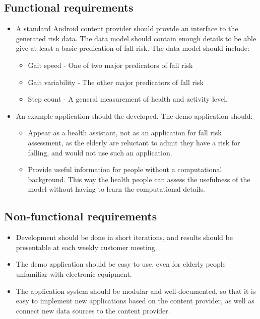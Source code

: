 \subsection{Functional requirements}
\begin{itemize}
\item A standard Android content provider should provide an interface to the generated risk data. The data model should contain enough details to be able give at least a basic predication of fall risk. The data model should include:
\begin{itemize}
\item Gait speed - One of two major predicators of fall risk
\item Gait variability - The other major predicators of fall risk
\item Step count - A general measurement of health and activity level.
\end{itemize}
\item An example application should the developed. The demo application should:
\begin{itemize}
\item Appear as a health assistant, not as an application for fall risk assessment, as the elderly are reluctant to admit they have a risk for falling, and would not use such an application.
\item Provide useful information for people without a computational background. This way the health people can assess the usefulness of the model without having to learn the computational details.
\end{itemize}	
\end{itemize}	

\subsection{Non-functional requirements}
\begin{itemize}
\item Development should be done in short iterations, and results should be presentable at each weekly customer meeting.
\item The demo application should be easy to use, even for elderly people unfamiliar with electronic equipment.
\item The application system should be modular and well-documented, so that it is easy to implement new applications based on the content provider, as well as connect new data sources to the content provider.
\end{itemize}	


